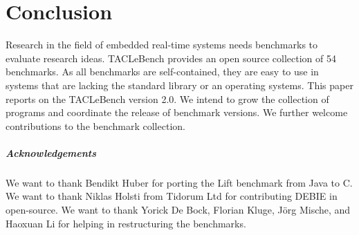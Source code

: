 \documentclass[a4paper,UKenglish]{oasics}
\newcommand{\benchcount}{54 }
\begin{document}
\section{Conclusion}
\label{sec:conclusion}

Research in the field of embedded real-time systems needs benchmarks to
evaluate research ideas. TACLeBench provides an open source collection of
\benchcount benchmarks. As all benchmarks are self-contained, they are easy to
use in systems that are lacking the standard library or an operating systems.
%
This paper reports on the TACLeBench version 2.0.
We intend to grow the collection of programs and coordinate the
release of benchmark versions.
We further welcome contributions to the benchmark collection.



\subparagraph*{Acknowledgements}

We want to thank Bendikt Huber for porting the Lift benchmark from Java to C.
We want to thank Niklas Holsti from Tidorum Ltd for contributing DEBIE in open-source.
We want to thank Yorick De Bock, Florian Kluge, J{\"o}rg Mische, and Haoxuan Li for helping in restructuring the benchmarks.



\end{document}
